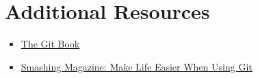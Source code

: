 \section{Additional Resources}

\begin{itemize}[leftmargin=*]
    \item \href{https://git-scm.com/book/en/v2}{The Git Book}
    \item \href{https://www.smashingmagazine.com/make-life-easier-when-using-git/}{Smashing Magazine: Make Life Easier When Using Git}
\end{itemize}
